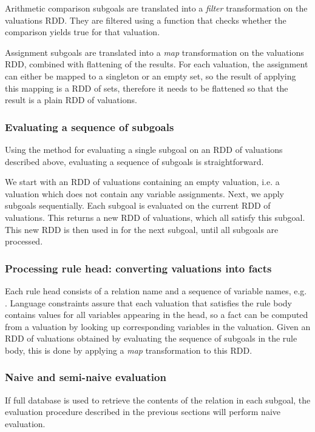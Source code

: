 Arithmetic comparison subgoals are translated into a \emph{filter} transformation on the valuations RDD. They are filtered using a function that checks whether the comparison yields true for that valuation. 

Assignment subgoals are translated into a \emph{map} transformation on the valuations RDD, combined with flattening of the results. For each valuation, the assignment can either be mapped to a singleton or an empty set, so the result of applying this mapping is a RDD of sets, therefore it needs to be flattened so that the result is a plain RDD of valuations.

\subsubsection{Evaluating a sequence of subgoals}
Using the method for evaluating a single subgoal on an RDD of valuations described above, evaluating a sequence of subgoals is straightforward. 

We start with an RDD of valuations containing an empty valuation, i.e. a valuation which does not contain any variable assignments. Next, we apply subgoals sequentially. Each subgoal is evaluated on the current RDD of valuations. This returns a new RDD of valuations, which all satisfy this subgoal. This new RDD is then used in for the next subgoal, until all subgoals are processed.

\subsubsection{Processing rule head: converting valuations into facts}

Each rule head consists of a relation name and a sequence of variable names, e.g. . Language constraints assure that each valuation that satisfies the rule body contains values for all variables appearing in the head, so a fact can be computed from a valuation by looking up corresponding variables in the valuation. Given an RDD of valuations obtained by evaluating the sequence of subgoals in the rule body, this is done by applying a \emph{map} transformation to this RDD.

\subsubsection{Naive and semi-naive evaluation}
If full database is used to retrieve the contents of the relation in each subgoal, the evaluation procedure described in the previous sections will perform naive evaluation.

